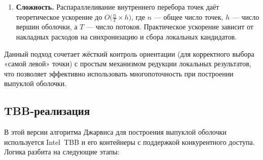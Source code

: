 \documentclass[12pt,a4paper]{article}
\begin{document}
\begin{enumerate}
  \item \textbf{Сложность.}  
    Распараллеливание внутреннего перебора точек даёт теоретическое ускорение до \(O\!\bigl(\tfrac{n}{T} \times h\bigr)\), где \(n\) — общее число точек, \(h\) — число вершин оболочки, а \(T\) — число потоков. Практическое ускорение зависит от накладных расходов на синхронизацию и сбора локальных кандидатов.
\end{enumerate}

Данный подход сочетает жёсткий контроль ориентации (для корректного выбора «самой левой» точки) с простым механизмом редукции локальных результатов, что позволяет эффективно использовать многопоточность при построении выпуклой оболочки.

\subsection*{TBB-реализация}
В этой версии алгоритма Джарвиса для построения выпуклой оболочки используется Intel TBB и его контейнеры с поддержкой конкурентного доступа. Логика разбита на следующие этапы:
\end{document}

